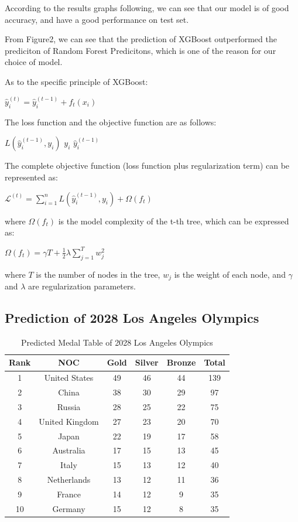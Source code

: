 According to the results graphs following, we can see that our model is of good accuracy, and have a good performance on test set.


From Figure2, we can see that the prediction of XGBoost outperformed the prediciton of Random Forest Predicitons, which is one of the reason for our choice of model.

As to the specific principle of XGBoost:

$\hat{y}_i^{(t)} = \hat{y}_i^{(t-1)} + f_t(x_i)$

The loss function and the objective function are as follows:

$L(\hat{y}_i^{(t-1)}, y_i)$ \quad {} $y_i$  $\hat{y}_i^{(t-1)}$

The complete objective function (loss function plus regularization term) can be represented as:

$\mathcal{L}^{(t)} = \sum_{i=1}^n L(\hat{y}_i^{(t-1)}, y_i) + \Omega(f_t)$

where $\Omega(f_t)$ is the model complexity of the t-th tree, which can be expressed as:

$\Omega(f_t) = \gamma T + \frac{1}{2} \lambda \sum_{j=1}^T w_j^2$

where $T$ is the number of nodes in the tree, $w_j$ is the weight of each node, and $\gamma$ and $\lambda$ are regularization parameters.

\subsection{Prediction of 2028 Los Angeles Olympics}
\begin{table}[htbp]
    \centering
    \caption{Predicted Medal Table of 2028 Los Angeles Olympics}
    \begin{tabular}{|c|c|c|c|c|c|}
        \hline
        Rank & NOC & Gold & Silver & Bronze & Total \\
        \hline
        1 & United States & 49 & 46 & 44 & 139 \\
        2 & China & 38 & 30 & 29 & 97 \\
        3 & Russia & 28 & 25 & 22 & 75 \\
        4 & United Kingdom & 27 & 23 & 20 & 70 \\
        5 & Japan & 22 & 19 & 17 & 58 \\
        6 & Australia & 17 & 15 & 13 & 45 \\
        7 & Italy & 15 & 13 & 12 & 40 \\
        8 & Netherlands & 13 & 12 & 11 & 36 \\
        9 & France & 14 & 12 & 9 & 35 \\
        10 & Germany & 15 & 12 & 8 & 35 \\
        \hline
    \end{tabular}
    \label{tab:2028}
\end{table}

